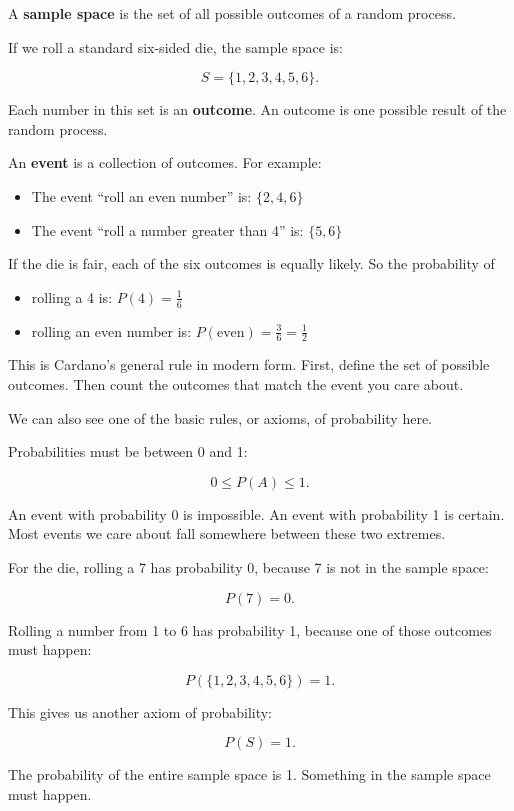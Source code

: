 \documentclass[
  letterpaper,
  DIV=11,
  numbers=noendperiod]{scrreprt}
\providecommand{\tightlist}{%
  \setlength{\itemsep}{0pt}\setlength{\parskip}{0pt}}
\begin{document}
\begin{tcolorbox}[enhanced jigsaw, arc=.35mm, bottomrule=.15mm, bottomtitle=1mm, breakable, colback=white, colbacktitle=quarto-callout-note-color!10!white, colframe=quarto-callout-note-color-frame, coltitle=black, left=2mm, leftrule=.75mm, opacityback=0, opacitybacktitle=0.6, rightrule=.15mm, title=\textcolor{quarto-callout-note-color}{\faInfo}\hspace{0.5em}{Some terminology}, titlerule=0mm, toprule=.15mm, toptitle=1mm]

A \textbf{sample space} is the set of all possible outcomes of a random
process.

If we roll a standard six-sided die, the sample space is:

\[
S = \{1,2,3,4,5,6\}.
\]

Each number in this set is an \textbf{outcome}. An outcome is one
possible result of the random process.

An \textbf{event} is a collection of outcomes. For example:

\begin{itemize}
\tightlist
\item
  The event ``roll an even number'' is: \(\{2,4,6\}\)
\item
  The event ``roll a number greater than 4'' is: \(\{5,6\}\)
\end{itemize}

If the die is fair, each of the six outcomes is equally likely. So the
probability of

\begin{itemize}
\tightlist
\item
  rolling a 4 is: \(P(4) = \frac{1}{6}\)
\item
  rolling an even number is:
  \(P(\text{even}) = \frac{3}{6} = \frac{1}{2}\)
\end{itemize}

This is Cardano's general rule in modern form. First, define the set of
possible outcomes. Then count the outcomes that match the event you care
about.

We can also see one of the basic rules, or axioms, of probability here.

Probabilities must be between 0 and 1:

\[
0 \leq P(A) \leq 1.
\]

An event with probability 0 is impossible. An event with probability 1
is certain. Most events we care about fall somewhere between these two
extremes.

For the die, rolling a 7 has probability 0, because 7 is not in the
sample space:

\[
P(7)=0.
\]

Rolling a number from 1 to 6 has probability 1, because one of those
outcomes must happen:

\[
P(\{1,2,3,4,5,6\})=1.
\]

This gives us another axiom of probability:

\[
P(S)=1.
\]

The probability of the entire sample space is 1. Something in the sample
space must happen.

\end{tcolorbox}
\end{document}
